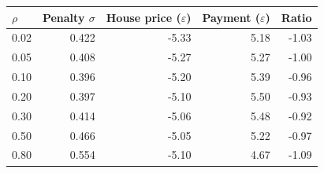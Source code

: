 \begin{tabular}{lrrrr}
\toprule
$\rho$ & Penalty $\sigma$ & House price ($\varepsilon$) & Payment ($\varepsilon$) & Ratio \\
\midrule
0.02 & 0.422 & -5.33 & 5.18 & -1.03 \\
0.05 & 0.408 & -5.27 & 5.27 & -1.00 \\
0.10 & 0.396 & -5.20 & 5.39 & -0.96 \\
0.20 & 0.397 & -5.10 & 5.50 & -0.93 \\
0.30 & 0.414 & -5.06 & 5.48 & -0.92 \\
0.50 & 0.466 & -5.05 & 5.22 & -0.97 \\
0.80 & 0.554 & -5.10 & 4.67 & -1.09 \\
\bottomrule
\end{tabular}
